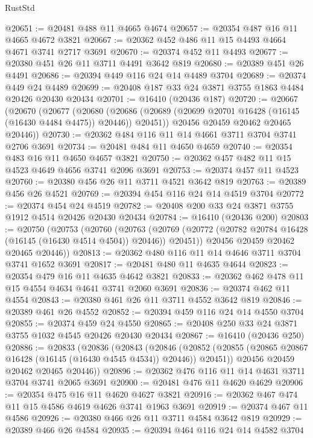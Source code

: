 \begin{lexlean}{RustStd}
\begin{coremodule}
@20651 := @20481 @488 @11 @4665 @4674
@20657 := @20354 @487 @16 @11 @4665 @4672 @3821
@20667 := @20362 @452 @486 @11 @15 @4493 @4664 @4671 @3741 @2717 @3691
@20670 := @20374 @452 @11 @4493
@20677 := @20380 @451 @26 @11 @3711 @4491 @3642 @819
@20680 := @20389 @451 @26 @4491
@20686 := @20394 @449 @116 @24 @14 @4489 @3704
@20689 := @20374 @449 @24 @4489
@20699 := @20408 @187 @33 @24 @3871 @3755 @1863 @4484 @20426 @20430 @20434
@20701 := @16410 (@20436 @187)
@20720 := @20667
    (@20670
      (@20677
        (@20680
          (@20686 (@20689 (@20699 @20701 @16428 (@16145 (@16430 @4484 @4475)) @20446)) @20451))
        @20456
        @20459
        @20462
        @20465
        @20446))
@20730 := @20362 @484 @116 @11 @14 @4661 @3711 @3704 @3741 @2706 @3691
@20734 := @20481 @484 @11 @4650 @4659
@20740 := @20354 @483 @16 @11 @4650 @4657 @3821
@20750 := @20362 @457 @482 @11 @15 @4523 @4649 @4656 @3741 @2096 @3691
@20753 := @20374 @457 @11 @4523
@20760 := @20380 @456 @26 @11 @3711 @4521 @3642 @819
@20763 := @20389 @456 @26 @4521
@20769 := @20394 @454 @116 @24 @14 @4519 @3704
@20772 := @20374 @454 @24 @4519
@20782 := @20408 @200 @33 @24 @3871 @3755 @1912 @4514 @20426 @20430 @20434
@20784 := @16410 (@20436 @200)
@20803 := @20750
    (@20753
      (@20760
        (@20763
          (@20769 (@20772 (@20782 @20784 @16428 (@16145 (@16430 @4514 @4504)) @20446)) @20451))
        @20456
        @20459
        @20462
        @20465
        @20446))
@20813 := @20362 @480 @116 @11 @14 @4646 @3711 @3704 @3741 @1652 @3691
@20817 := @20481 @480 @11 @4635 @4644
@20823 := @20354 @479 @16 @11 @4635 @4642 @3821
@20833 := @20362 @462 @478 @11 @15 @4554 @4634 @4641 @3741 @2060 @3691
@20836 := @20374 @462 @11 @4554
@20843 := @20380 @461 @26 @11 @3711 @4552 @3642 @819
@20846 := @20389 @461 @26 @4552
@20852 := @20394 @459 @116 @24 @14 @4550 @3704
@20855 := @20374 @459 @24 @4550
@20865 := @20408 @250 @33 @24 @3871 @3755 @1032 @4545 @20426 @20430 @20434
@20867 := @16410 (@20436 @250)
@20886 := @20833
    (@20836
      (@20843
        (@20846
          (@20852 (@20855 (@20865 @20867 @16428 (@16145 (@16430 @4545 @4534)) @20446)) @20451))
        @20456
        @20459
        @20462
        @20465
        @20446))
@20896 := @20362 @476 @116 @11 @14 @4631 @3711 @3704 @3741 @2065 @3691
@20900 := @20481 @476 @11 @4620 @4629
@20906 := @20354 @475 @16 @11 @4620 @4627 @3821
@20916 := @20362 @467 @474 @11 @15 @4586 @4619 @4626 @3741 @1963 @3691
@20919 := @20374 @467 @11 @4586
@20926 := @20380 @466 @26 @11 @3711 @4584 @3642 @819
@20929 := @20389 @466 @26 @4584
@20935 := @20394 @464 @116 @24 @14 @4582 @3704

\end{coremodule}
\end{lexlean}

